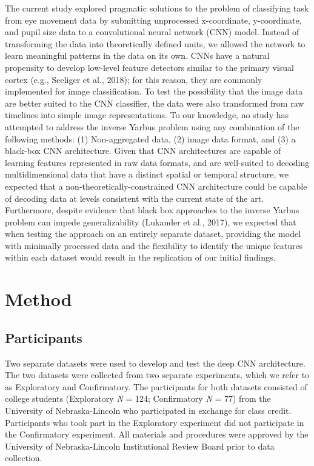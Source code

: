 \documentclass[
  english,
  man, donotrepeattitle,floatsintext]{apa6}
\begin{document}
The current study explored pragmatic solutions to the problem of classifying task from eye movement data by submitting unprocessed x-coordinate, y-coordinate, and pupil size data to a convolutional neural network (CNN) model. Instead of transforming the data into theoretically defined units, we allowed the network to learn meaningful patterns in the data on its own. CNNs have a natural propensity to develop low-level feature detectors similar to the primary visual cortex (e.g., Seeliger et al., 2018); for this reason, they are commonly implemented for image classification. To test the possibility that the image data are better suited to the CNN classifier, the data were also transformed from raw timelines into simple image representations. To our knowledge, no study has attempted to address the inverse Yarbus problem using any combination of the following methods: (1) Non-aggregated data, (2) image data format, and (3) a black-box CNN architecture. Given that CNN architectures are capable of learning features represented in raw data formats, and are well-suited to decoding multidimensional data that have a distinct spatial or temporal structure, we expected that a non-theoretically-constrained CNN architecture could be capable of decoding data at levels consistent with the current state of the art. Furthermore, despite evidence that black box approaches to the inverse Yarbus problem can impede generalizability (Lukander et al., 2017), we expected that when testing the approach on an entirely separate dataset, providing the model with minimally processed data and the flexibility to identify the unique features within each dataset would result in the replication of our initial findings.

\section{Method}
\subsection{Participants}

Two separate datasets were used to develop and test the deep CNN architecture. The two datasets were collected from two separate experiments, which we refer to as Exploratory and Confirmatory. The participants for both datasets consisted of college students (Exploratory \emph{N} = 124; Confirmatory \emph{N} = 77) from the University of Nebraska-Lincoln who participated in exchange for class credit. Participants who took part in the Exploratory experiment did not participate in the Confirmatory experiment. All materials and procedures were approved by the University of Nebraska-Lincoln Institutional Review Board prior to data collection.
\end{document}
